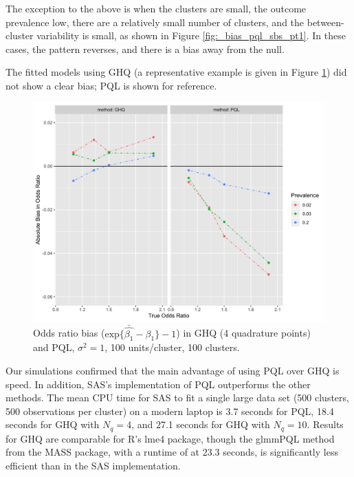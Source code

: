 \documentclass[Afour,times,sagev,doublespace]{sagej}
\begin{document}
The exception to the above is when the clusters are small, the outcome prevalence low, there are a relatively small number of clusters, and the between-cluster variability is small, as shown in Figure \ref{fig:_bias_pql_sbs_pt1}. In these cases, the pattern reverses, and there is a bias away from the null.

The fitted models using GHQ (a representative example is given in Figure \ref{fig:_bias_pql_ghq4}) did not show a clear bias; PQL is shown for reference.

\begin{figure}
\centering
\includegraphics[width=\linewidth]{_bias_pql_ghq4.png}
  \caption{Odds ratio bias ($\text{exp} \{ \bar{\hat{\beta_1}} - \beta_1 \} - 1$) in GHQ (4 quadrature points) and PQL, $\sigma^2=1$, 100 units/cluster, 100 clusters.}
  \label{fig:_bias_pql_ghq4}
\end{figure}

Our simulations confirmed that the main advantage of using PQL over GHQ is speed.  In addition, SAS's implementation of PQL outperforms the other methods. The mean CPU time for SAS to fit a single large data set (500 clusters, 500 observations per cluster) on a modern laptop is 3.7 seconds for PQL, 18.4 seconds for GHQ with $N_q=4$, and 27.1 seconds for GHQ with $N_q=10$. Results for GHQ are comparable for R's lme4 package, though the glmmPQL method from the MASS package, with a runtime of at 23.3 seconds, is significantly less efficient than in the SAS implementation.
\end{document}
